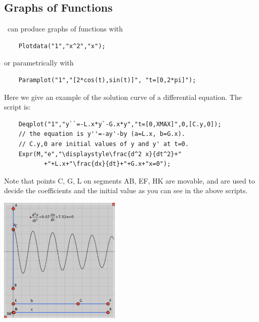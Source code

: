 \documentclass[papersize,a4paper,12pt]{article}
\begin{document}
\subsection{Graphs of Functions}
\ketcindy\ can produce graphs of functions with
\begin{verbatim}
    Plotdata("1","x^2","x");
\end{verbatim}
or parametrically with
\begin{verbatim}
    Paramplot("1","[2*cos(t),sin(t)]", "t=[0,2*pi]");
\end{verbatim}
\noindent Here we give an example of the solution curve of a differential equation. The script is:
\begin{verbatim}
    Deqplot("1","y``=-L.x*y`-G.x*y","t=[0,XMAX]",0,[C.y,0]);
    // the equation is y''=-ay'-by (a=L.x, b=G.x).
    // C.y,0 are initial values of y and y' at t=0.
    Expr(M,"e","\displaystyle\frac{d^2 x}{dt^2}+"
           +"+L.x+"\frac{dx}{dt}+"+G.x+"x=0");
\end{verbatim}

Note that points C, G, L  on segments AB, EF, HK are movable, and 
are used to decide the coefficients and the initial value as you can see in the above scripts.
\vspace{3mm}

\begin{center}
\includegraphics[bb=0.00 0.00 385.00 398.00,height=60mm]{Fig/diffeq1.pdf}
\hspace{5mm}


\end{center}

\end{document}
